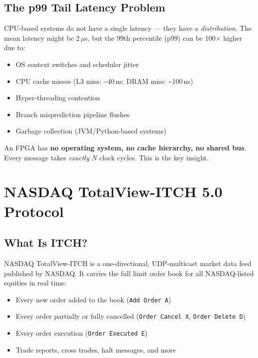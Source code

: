\documentclass[11pt,a4paper]{article}
\begin{document}
\subsection{The p99 Tail Latency Problem}

CPU-based systems do not have a single latency — they have a \emph{distribution}.
The mean latency might be 2\,$\mu$s, but the 99th percentile (p99) can be 100$\times$
higher due to:

\begin{itemize}[itemsep=2pt]
  \item OS context switches and scheduler jitter
  \item CPU cache misses (L3 miss: \textasciitilde{}40\,ns; DRAM miss: \textasciitilde{}100\,ns)
  \item Hyper-threading contention
  \item Branch misprediction pipeline flushes
  \item Garbage collection (JVM/Python-based systems)
\end{itemize}

An FPGA has \textbf{no operating system, no cache hierarchy, no shared bus}.
Every message takes \emph{exactly} $N$ clock cycles. This is the key insight.

\section{NASDAQ TotalView-ITCH 5.0 Protocol}

\subsection{What Is ITCH?}

NASDAQ TotalView-ITCH is a one-directional, UDP-multicast market data feed
published by NASDAQ. It carries the full limit order book for all NASDAQ-listed
equities in real time:

\begin{itemize}[itemsep=2pt]
  \item Every new order added to the book (\texttt{Add Order A})
  \item Every order partially or fully cancelled (\texttt{Order Cancel X}, \texttt{Order Delete D})
  \item Every order execution (\texttt{Order Executed E})
  \item Trade reports, cross trades, halt messages, and more
\end{itemize}
\end{document}
